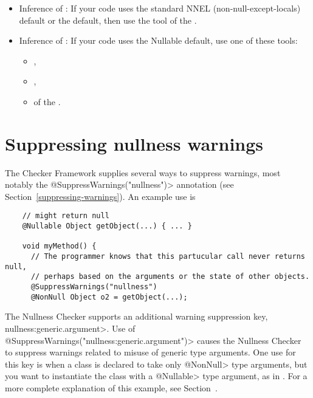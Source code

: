 \begin{itemize}

\item
  Inference of :
  If your code uses the standard NNEL (non-null-except-locals) default or
  the  default, then use the
  tool of the .

\item
  Inference of :
  If your code uses the Nullable default, use one of these tools:
\begin{itemize}
\item
  ,
\item
  ,
\item
   of the .
\end{itemize}

\end{itemize}



\section{Suppressing nullness warnings\label{suppressing-warnings-nullness}}

The Checker Framework supplies several ways to suppress warnings, most
notably the \<@SuppressWarnings("nullness")> annotation (see
Section~\ref{suppressing-warnings}).  An example use is

\begin{Verbatim}
    // might return null
    @Nullable Object getObject(...) { ... }

    void myMethod() {
      // The programmer knows that this partucular call never returns null,
      // perhaps based on the arguments or the state of other objects.
      @SuppressWarnings("nullness")
      @NonNull Object o2 = getObject(...);
\end{Verbatim}


The Nullness Checker supports an additional warning suppression key,
\<nullness:generic.argument>.
Use of \<@SuppressWarnings("nullness:generic.argument")> causes the Nullness
Checker to suppress warnings related to misuse of generic type
arguments.  One use for this key is when a class is declared to take only
\<@NonNull> type arguments, but you want to instantiate the class with a
\<@Nullable> type argument, as in .  For a more
complete explanation of this example, see
Section~.

